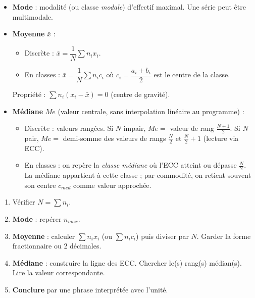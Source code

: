 \documentclass[11pt]{article}
\begin{document}
\begin{propriete}
\begin{itemize}
\item \textbf{Mode} : modalité (ou classe \emph{modale}) d'effectif maximal. Une série peut être multimodale.
\item \textbf{Moyenne} $\bar{x}$ :
\begin{itemize}
\item Discrète : $\bar{x} = \dfrac{1}{N}\sum n_i x_i$.
\item En classes : $\bar{x} = \dfrac{1}{N}\sum n_i c_i$ où $c_i = \dfrac{a_i+b_i}{2}$ est le centre de la classe.
\end{itemize}
Propriété : $\sum n_i(x_i - \bar{x}) = 0$ (centre de gravité).
\item \textbf{Médiane} $Me$ (valeur centrale, sans interpolation linéaire au programme) :
\begin{itemize}
\item Discrète : valeurs rangées. Si $N$ impair, $Me =$ valeur de rang $\frac{N+1}{2}$. Si $N$ pair, $Me =$ demi-somme des valeurs de rangs $\frac{N}{2}$ et $\frac{N}{2}+1$ (lecture via ECC).
\item En classes : on repère la \emph{classe médiane} où l'ECC atteint ou dépasse $\frac{N}{2}$. La médiane appartient à cette classe ; par commodité, on retient souvent son centre $c_{med}$ comme valeur approchée.
\end{itemize}
\end{itemize}
\end{propriete}

\begin{methode}
\begin{enumerate}
\item Vérifier $N = \sum n_i$.
\item \textbf{Mode} : repérer $n_{max}$.
\item \textbf{Moyenne} : calculer $\sum n_i x_i$ (ou $\sum n_i c_i$) puis diviser par $N$. Garder la forme fractionnaire ou 2 décimales.
\item \textbf{Médiane} : construire la ligne des ECC. Chercher le(s) rang(s) médian(s). Lire la valeur correspondante.
\item \textbf{Conclure} par une phrase interprétée avec l'unité.
\end{enumerate}
\end{methode}
\end{document}
